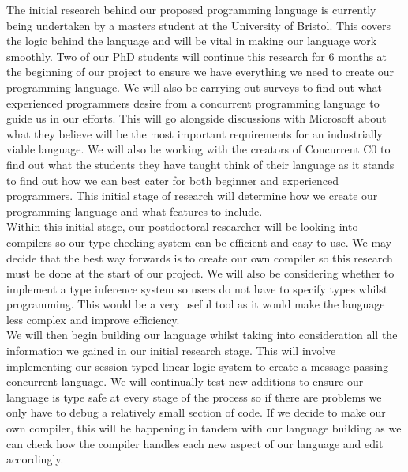 \documentclass[11pt]{article}
\begin{document}
    \noindent
    The initial research behind our proposed programming language is currently being undertaken by a masters 
    student at the University of Bristol. This covers the logic behind the language and will be vital in 
    making our language work smoothly. Two of our PhD students will continue this research for 6 months at 
    the beginning of our project to ensure we have everything we need to create our programming language. 
    We will also be carrying out surveys to find out what experienced programmers desire from a concurrent 
    programming language to guide us in our efforts. This will go alongside discussions with Microsoft about 
    what they believe will be the most important requirements for an industrially viable language. We will 
    also be working with the creators of Concurrent C0 to find out what the students they have taught think of their 
    language as it stands to find out how we can best cater for both beginner and experienced programmers. 
    This initial stage of research will determine how we create our programming language and what features 
    to include. \\

    \noindent
    Within this initial stage, our postdoctoral researcher will be looking into compilers so our 
    type-checking system can be efficient and easy to use. We may decide that the best way forwards is 
    to create our own compiler so this research must be done at the start of our project. We will also 
    be considering whether to implement a type inference system so users do not have to specify types 
    whilst programming. This would be a very useful tool as it would make the language less complex 
    and improve efficiency. \\

    \noindent
    We will then begin building our language whilst taking into consideration all the information we gained 
    in our initial research stage. This will involve implementing our session-typed linear logic system 
    to create a message passing concurrent language. We will continually test new additions to ensure 
    our language is type safe at every stage of the process so if there are problems we only have to debug 
    a relatively small section of code. If we decide to make our own compiler, this will be happening in 
    tandem with our language building as we can check how the compiler handles each new aspect of our language 
    and edit accordingly. \\
\end{document}
